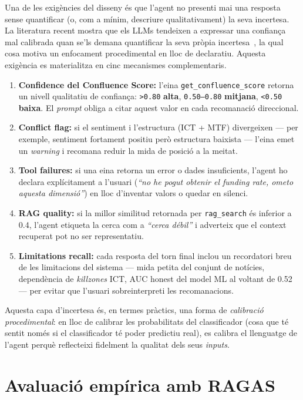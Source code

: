\documentclass[12pt, a4paper]{report}
\begin{document}
Una de les exigències del disseny és que l'agent no presenti mai una resposta sense quantificar (o, com a mínim, descriure qualitativament) la seva incertesa. La literatura recent mostra que els LLMs tendeixen a expressar una confiança mal calibrada quan se'ls demana quantificar la seva pròpia incertesa~\cite{xiong2024}, la qual cosa motiva un enfocament procedimental en lloc de declaratiu. Aquesta exigència es materialitza en cinc mecanismes complementaris.

\begin{enumerate}[leftmargin=*]
  \item \textbf{Confidence del Confluence Score:} l'eina \texttt{get\_confluence\_score} retorna un nivell qualitatiu de confiança: \texttt{>0.80} \textbf{alta}, \texttt{0.50--0.80} \textbf{mitjana}, \texttt{<0.50} \textbf{baixa}. El \textit{prompt} obliga a citar aquest valor en cada recomanació direccional.
  \item \textbf{Conflict flag:} si el sentiment i l'estructura (ICT + MTF) divergeixen --- per exemple, sentiment fortament positiu però estructura baixista --- l'eina emet un \emph{warning} i recomana reduir la mida de posició a la meitat.
  \item \textbf{Tool failures:} si una eina retorna un error o dades insuficients, l'agent ho declara explícitament a l'usuari (\textit{``no he pogut obtenir el funding rate, ometo aquesta dimensió''}) en lloc d'inventar valors o quedar en silenci.
  \item \textbf{RAG quality:} si la millor similitud retornada per \texttt{rag\_search} és inferior a 0.4, l'agent etiqueta la cerca com a \emph{``cerca débil''} i adverteix que el context recuperat pot no ser representatiu.
  \item \textbf{Limitations recall:} cada resposta del torn final inclou un recordatori breu de les limitacions del sistema --- mida petita del conjunt de notícies, dependència de \textit{killzones} ICT, AUC honest del model ML al voltant de 0.52 --- per evitar que l'usuari sobreinterpreti les recomanacions.
\end{enumerate}

Aquesta capa d'incertesa és, en termes pràctics, una forma de \emph{calibració procedimental}: en lloc de calibrar les probabilitats del classificador (cosa que té sentit només si el classificador té poder predictiu real), es calibra el llenguatge de l'agent perquè reflecteixi fidelment la qualitat dels seus \emph{inputs}.

\section{Avaluació empírica amb RAGAS}
\end{document}
